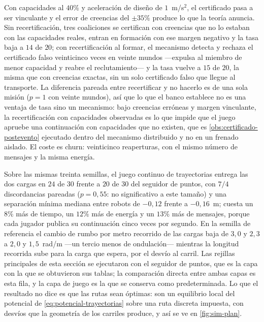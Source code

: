 \begin{observacion}
\label{obs:ensayo-cierre-hiperjuego2}
Con capacidades al $40\%$ y aceleración de diseño de $1$~m/s$^2$, el
certificado pasa a ser vinculante y el error de creencias del $\pm35\%$
produce lo que la teoría anuncia. Sin recertificación, tres coaliciones se
certifican con creencias que no lo estaban con las capacidades reales, entran
en formación con ese margen negativo y la tasa baja a $14$ de $20$; con
recertificación al formar, el mecanismo detecta y rechaza el certificado
falso veinticinco veces en veinte mundos —expulsa al miembro de menor
capacidad y reabre el reclutamiento— y la tasa vuelve a $15$ de $20$, la
misma que con creencias exactas, sin un solo certificado falso que llegue al
transporte. La diferencia pareada entre recertificar y no hacerlo es de una
sola misión ($p=1$ con veinte mundos), así que lo que el banco establece no
es una ventaja de tasa sino un mecanismo: bajo creencias erróneas y margen
vinculante, la recertificación con capacidades observadas es lo que impide
que el juego apruebe una continuación con capacidades que no existen, que es
\cref{obs:certificado-postevento} ejecutado dentro del mecanismo distribuido
y no en un frenado aislado. El coste es churn: veinticinco reaperturas, con
el mismo número de mensajes y la misma energía.
\end{observacion}

\begin{observacion}
\label{obs:ensayo-cierre-planificador}
Sobre las mismas treinta semillas, el juego continuo de trayectorias entrega
las dos cargas en $24$ de $30$ frente a $20$ de $30$ del seguidor de puntos,
con $7/4$ discordancias pareadas ($p=0{,}55$: no significativo a este tamaño)
y una separación mínima mediana entre robots de $-0{,}12$ frente a
$-0{,}16$~m; cuesta un $8\%$ más de tiempo, un $12\%$ más de energía y un
$13\%$ más de mensajes, porque cada jugador publica su continuación cinco veces
por segundo. En la semilla de referencia el cambio de rumbo por metro recorrido
de las cargas baja de $3{,}0$ y $2{,}3$ a $2{,}0$ y $1{,}5$~rad/m —un tercio
menos de ondulación— mientras la longitud recorrida sube para la carga que
espera, por el desvío al carril. Las rejillas principales de esta sección se
ejecutaron con el seguidor de puntos, que es la capa con la que se obtuvieron
sus tablas; la comparación directa entre ambas capas es esta fila, y la capa
de juego es la que se conserva como predeterminada. Lo que el resultado no
dice es que las rutas sean óptimas: son un equilibrio local del potencial de
\eqref{eq:potencial-trayectorias} sobre una ruta discreta impuesta, con
desvíos que la geometría de los carriles produce, y así se ve en
\cref{fig:sim-plan}.
\end{observacion}

